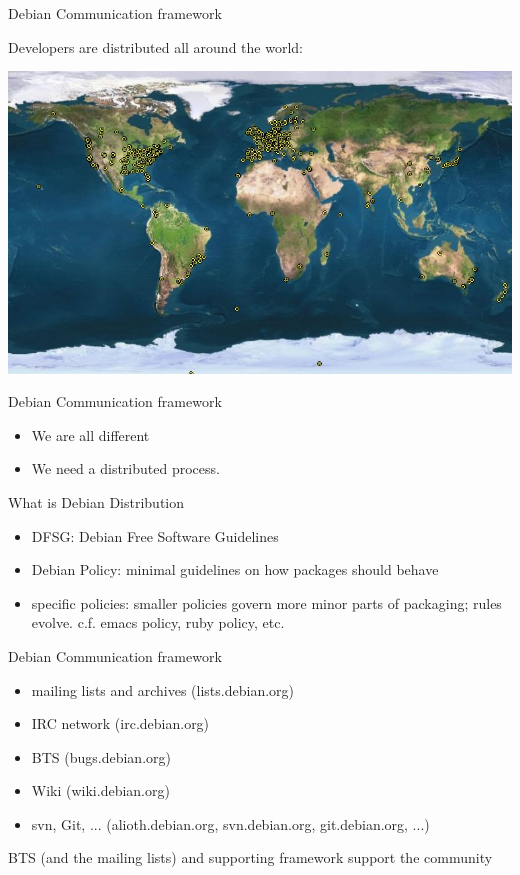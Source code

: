 \documentclass[cjk,dvipdfm,12pt]{beamer}
\begin{document}
\begin{frame}{Debian Communication framework }

Developers are distributed all around the world:

 \includegraphics[width=1\hsize]{image200805/developers-map.jpeg} 

\end{frame}

\begin{frame}{Debian Communication framework }

\begin{itemize}
 \item  We are all different

 \item  We need a distributed process.
\end{itemize}

\end{frame}

\begin{frame}{What is Debian Distribution}
\begin{itemize}
 \item DFSG: Debian Free Software Guidelines
 \item Debian Policy: minimal guidelines on how packages should behave
 \item specific policies: smaller policies govern more minor parts of
       packaging; rules evolve. c.f. emacs policy, ruby policy, etc.
\end{itemize}
\end{frame}

\begin{frame}{Debian Communication framework}
 \begin{itemize}
  \item mailing lists and archives (lists.debian.org)
  \item IRC network (irc.debian.org)
  \item BTS (bugs.debian.org)
  \item Wiki (wiki.debian.org)
  \item svn, Git, ... (alioth.debian.org, svn.debian.org,
	git.debian.org, ...)
 \end{itemize}

BTS (and the mailing lists) and supporting framework support the community

\end{frame}
\end{document}
